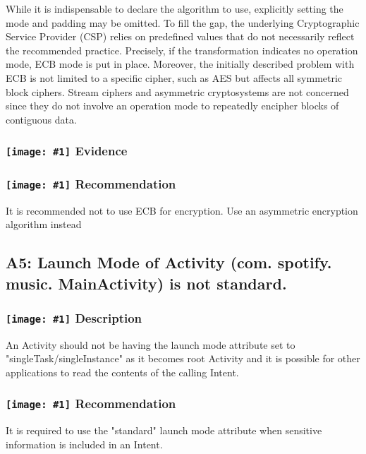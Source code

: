 \documentclass[12p]{article}
\newcommand{\icon}[1]{\texttt{[image: \#1]}}
\begin{document}
            While it is indispensable to declare the algorithm to use, explicitly setting the mode and
            padding may be omitted. To fill the gap, the underlying Cryptographic Service Provider (CSP)
            relies on predefined values that do not necessarily reflect the recommended practice. Precisely, if
            the transformation indicates no operation mode, ECB mode is put in place. Moreover, the initially
            described problem with ECB is not limited to a specific cipher, such as AES but affects all symmetric
            block ciphers. Stream ciphers and asymmetric cryptosystems are not concerned since they
            do not involve an operation mode to repeatedly encipher blocks of contiguous data.
        
\subsubsection*{\protect\icon{/home/miki/Documents/GITHUB/AndroidPermissions/python/vulns/report_icons/basic_magnifier.png} Evidence}

\subsubsection*{\protect\icon{/home/miki/Documents/GITHUB/AndroidPermissions/python/vulns/report_icons/basic_todo.png} Recommendation}
It is recommended not to use ECB for encryption. Use an asymmetric encryption algorithm instead
\subsection{A5: Launch Mode of Activity (com. spotify. music. MainActivity) is not standard.}
\subsubsection*{\protect\icon{/home/miki/Documents/GITHUB/AndroidPermissions/python/vulns/report_icons/basic_sheet.png} Description}
An Activity should not be having the launch mode attribute set to "singleTask/singleInstance" as it becomes root Activity and it is possible for other applications to read the contents of the calling Intent.
\subsubsection*{\protect\icon{/home/miki/Documents/GITHUB/AndroidPermissions/python/vulns/report_icons/basic_todo.png} Recommendation}
It is required to use the "standard" launch mode attribute when sensitive information is included in an Intent.
\end{document}
